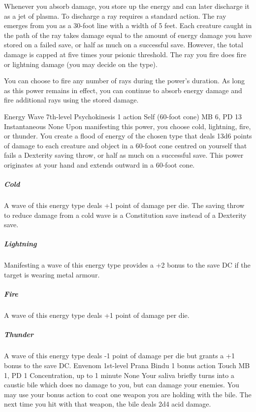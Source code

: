 Whenever you absorb damage, you store up the energy and can
later discharge it as a jet of plasma. To discharge a ray
requires a standard action. The ray emerges from you as a
30-foot line with a width of 5 feet. Each creature caught
in the path of the ray takes damage equal to the amount of
energy damage you have stored on a failed save, or half as
much on a successful save. However, the total damage is capped
at five times your psionic threshold. The ray you fire
does fire or lightning damage (you may decide on the type).

You can choose to fire any number of rays during the power's
duration. As long as this power remains in effect, you can
continue to absorb energy damage and fire additional rays
using the stored damage.

\DndPowerHeader%
    {Energy Wave\label{pwr:energy_wave}}
    {7th-level Psychokinesis}
    {1 action}
    {Self (60-foot cone)}
    {MB 6, PD 13}
    {Instantaneous}
    {None}
Upon manifesting this power,
you choose cold, lightning, fire, or thunder.
You create a flood of energy of the chosen type
that deals 13d6 points of damage
to each creature and object in a 60-foot cone
centred on yourself that fails a Dexterity saving throw,
or half as much on a successful save.
This power originates at your hand
and extends outward in a 60-foot cone.

\subparagraph{Cold}
A wave of this energy type deals +1 point
of damage per die.
The saving throw to reduce damage from a cold wave
is a Constitution save instead of a Dexterity save.  

\subparagraph{Lightning}
Manifesting a wave of this energy type
provides a +2 bonus to the save DC if the target is wearing
metal armour.

\subparagraph{Fire}
A wave of this energy type deals +1 point of damage per die.

\subparagraph{Thunder}
A wave of this energy type deals -1 point of damage per die
but grants a +1 bonus to the save DC.
\DndPowerHeader%
    {Envenom\label{pwr:envenom}}
    {1st-level Prana Bindu}
    {1 bonus action}
    {Touch}
    {MB 1, PD 1}
    {Concentration, up to 1 minute}
    {None}
Your saliva briefly turns into a caustic
bile which does no damage to you, but can damage your enemies.
You may use your bonus action to coat one weapon you are holding
with the bile. The next time you hit with that weapon, the
bile deals 2d4 acid damage.

